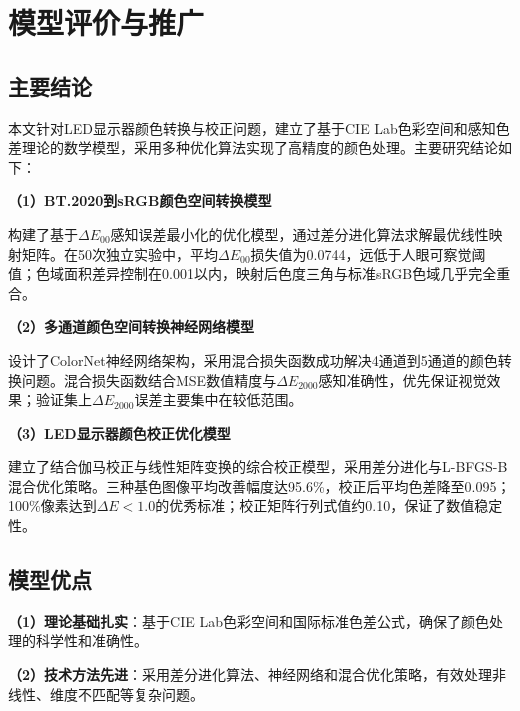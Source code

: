 \chapter[\hspace{0pt}模型评价与推广]{{\heiti{}\hspace{0pt}模型评价与推广}}\label{chapter4: 模型评价与推广}
\removelofgap
\removelotgap

\section[\hspace{-2pt}主要结论]{{\heiti{} \hspace{-8pt}主要结论}}\label{section5: 主要结论}

本文针对LED显示器颜色转换与校正问题，建立了基于CIE Lab色彩空间和感知色差理论的数学模型，采用多种优化算法实现了高精度的颜色处理。主要研究结论如下：

\noindent\textbf{（1）BT.2020到sRGB颜色空间转换模型}

构建了基于$\Delta E_{00}$感知误差最小化的优化模型，通过差分进化算法求解最优线性映射矩阵。在50次独立实验中，平均$\Delta E_{00}$损失值为0.0744，远低于人眼可察觉阈值；色域面积差异控制在0.001以内，映射后色度三角与标准sRGB色域几乎完全重合。

\noindent\textbf{（2）多通道颜色空间转换神经网络模型}

设计了ColorNet神经网络架构，采用混合损失函数成功解决4通道到5通道的颜色转换问题。混合损失函数结合MSE数值精度与$\Delta E_{2000}$感知准确性，优先保证视觉效果；验证集上$\Delta E_{2000}$误差主要集中在较低范围。

\noindent\textbf{（3）LED显示器颜色校正优化模型}

建立了结合伽马校正与线性矩阵变换的综合校正模型，采用差分进化与L-BFGS-B混合优化策略。三种基色图像平均改善幅度达95.6\%，校正后平均色差降至0.095；100\%像素达到$\Delta E<1.0$的优秀标准；校正矩阵行列式值约0.10，保证了数值稳定性。

\section[\hspace{-2pt}模型优点]{{\heiti{} \hspace{-8pt}模型优点}}\label{section5: 模型优点}

\noindent\textbf{（1）理论基础扎实}：基于CIE Lab色彩空间和国际标准色差公式，确保了颜色处理的科学性和准确性。

\noindent\textbf{（2）技术方法先进}：采用差分进化算法、神经网络和混合优化策略，有效处理非线性、维度不匹配等复杂问题。

